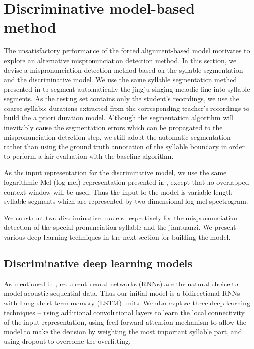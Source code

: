 \section{Discriminative model-based method}\label{sec:ch6:discriminative_model_method}

The unsatisfactory performance of the forced alignment-based model motivates to explore an alternative mispronunciation detection method. In this section, we devise a mispronunciation detection method based on the syllable segmentation and the discriminative model. We use the same syllable segmentation method presented in  to segment automatically the jingju singing melodic line into syllable segments. As the testing set contains only the student's recordings, we use the coarse syllabic durations extracted from the corresponding teacher's recordings to build the a priori duration model. Although the segmentation algorithm will inevitably cause the segmentation errors which can be propagated to the mispronunciation detection step, we still adopt the automatic segmentation rather than using the ground truth annotation of the syllable boundary in order to perform a fair evaluation with the baseline algorithm.

As the input representation for the discriminative model, we use the same logarithmic Mel (log-mel) representation presented in , except that no overlapped context window will be used. Thus the input to the model is variable-length syllable segments which are represented by two dimensional log-mel spectrogram. 

We construct two discriminative models respectively for the mispronunciation detection of the special pronunciation syllable and the \gls{jiantuanzi}. We present various deep learning techniques in the next section for building the model.

\subsection{Discriminative deep learning models}\label{sec:ch6:discriminative_dl_models}

As mentioned in , recurrent neural networks (RNNs) are the natural choice to model acoustic sequential data. Thus our initial model is a bidirectional RNNs with Long short-term memory (LSTM) units. We also explore three deep learning techniques -- using additional convolutional layers to learn the local connectivity of the input representation, using feed-forward attention mechanism to allow the model to make the decision by weighting the most important syllable part, and using dropout to overcome the overfitting.

